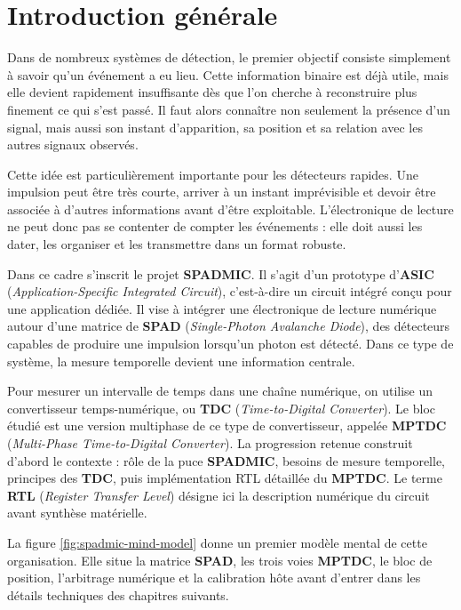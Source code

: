 \chapter{Introduction générale}
\label{chap:introduction}
\justifying
\sloppy

Dans de nombreux systèmes de détection, le premier objectif consiste simplement à savoir qu'un événement a eu lieu. Cette information binaire est déjà utile, mais elle devient rapidement insuffisante dès que l'on cherche à reconstruire plus finement ce qui s'est passé. Il faut alors connaître non seulement la présence d'un signal, mais aussi son instant d'apparition, sa position et sa relation avec les autres signaux observés.

Cette idée est particulièrement importante pour les détecteurs rapides. Une impulsion peut être très courte, arriver à un instant imprévisible et devoir être associée à d'autres informations avant d'être exploitable. L'électronique de lecture ne peut donc pas se contenter de compter les événements : elle doit aussi les dater, les organiser et les transmettre dans un format robuste.

Dans ce cadre s'inscrit le projet \textbf{SPADMIC}. Il s'agit d'un prototype d'\textbf{ASIC} (\textit{Application-Specific Integrated Circuit}), c'est-à-dire un circuit intégré conçu pour une application dédiée. Il vise à intégrer une électronique de lecture numérique autour d'une matrice de \textbf{SPAD} (\textit{Single-Photon Avalanche Diode}), des détecteurs capables de produire une impulsion lorsqu'un photon est détecté. Dans ce type de système, la mesure temporelle devient une information centrale.

Pour mesurer un intervalle de temps dans une chaîne numérique, on utilise un convertisseur temps-numérique, ou \textbf{TDC} (\textit{Time-to-Digital Converter}). Le bloc étudié est une version multiphase de ce type de convertisseur, appelée \textbf{MPTDC} (\textit{Multi-Phase Time-to-Digital Converter}). La progression retenue construit d'abord le contexte : rôle de la puce \textbf{SPADMIC}, besoins de mesure temporelle, principes des \textbf{TDC}, puis implémentation RTL détaillée du \textbf{MPTDC}. Le terme \textbf{RTL} (\textit{Register Transfer Level}) désigne ici la description numérique du circuit avant synthèse matérielle.

La figure \ref{fig:spadmic-mind-model} donne un premier modèle mental de cette organisation. Elle situe la matrice \textbf{SPAD}, les trois voies \textbf{MPTDC}, le bloc de position, l'arbitrage numérique et la calibration hôte avant d'entrer dans les détails techniques des chapitres suivants.

